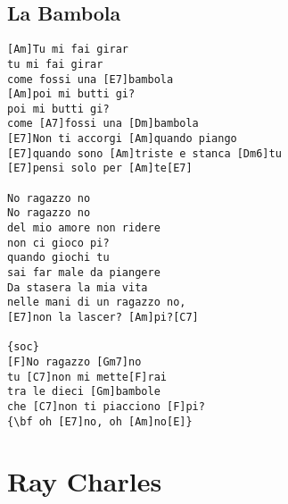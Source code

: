 \documentclass[a4paper]{article}
\begin{document}
\subsection{La Bambola} %
\label{sub:La Bambol}
\begin{Verbatim}[commandchars=\\\{\}]
[Am]Tu mi fai girar
tu mi fai girar
come fossi una [E7]bambola
[Am]poi mi butti gi?
poi mi butti gi?
come [A7]fossi una [Dm]bambola
[E7]Non ti accorgi [Am]quando piango
[E7]quando sono [Am]triste e stanca [Dm6]tu
[E7]pensi solo per [Am]te[E7]

No ragazzo no
No ragazzo no
del mio amore non ridere
non ci gioco pi?
quando giochi tu
sai far male da piangere
Da stasera la mia vita
nelle mani di un ragazzo no,
[E7]non la lascer? [Am]pi?[C7]

{soc}
[F]No ragazzo [Gm7]no
tu [C7]non mi mette[F]rai
tra le dieci [Gm]bambole
che [C7]non ti piacciono [F]pi?
{\bf oh [E7]no, oh [Am]no[E]}
\end{Verbatim}
\newpage
\section{Ray Charles} %
\label{sec:Ray Charles}
\end{document}
